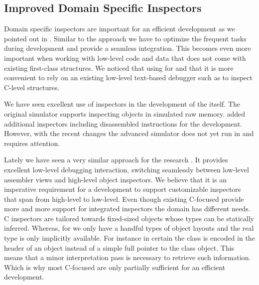 \subsection{Improved Domain Specific Inspectors}
Domain specific inspectors are important for an efficient development as we pointed out in .
Similar to the \JIT approach we have to optimize the frequent tasks during development and provide a seamless integration.
This becomes even more important when working with low-level code and data that does not come with existing first-class structures.
We noticed that using \B for \NBJ and \WF that it is more convenient to rely on an existing low-level text-based debugger such as  to inspect C-level structures.

We have seen excellent use of inspectors in the \VM development of the \Cog \VM itself.
The original simulator supports inspecting objects in simulated raw memory.
\Cog added additional inspectors including disassembled instructions for the \JIT development.
However, with the recent changes the advanced simulator does not yet run in \PH and requires attention.

Lately we have seen a very similar approach for the \Maxine research \VM \cite{Wimm13a}.
It provides excellent low-level debugging interaction, switching seamlessly between low-level assembler views and high-level object inspectors.
We believe that it is an imperative requirement for a \VM development \IDE to support customizable inspectors that span from high-level to low-level.
Even though existing C-focused \IDEs provide more and more support for integrated inspectors the \VM domain has different needs.
C inspectors are tailored towards fixed-sized objects whose types can be statically inferred.
Whereas, for \VMs we only have a handful types of object layouts and the real type is only implicitly available.
For instance in certain \VMs the class is encoded in the header of an object instead of a simple full pointer to the class object.
This means that a minor interpretation pass is necessary to retrieve such information.
Which is why most C-focused \IDEs are only partially sufficient for an efficient \VM development.


